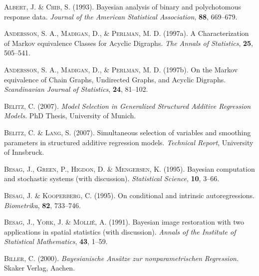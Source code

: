
\begin{thebibliography}{99}

\label{stepwiseregreferences}

 {\scshape Albert, J. \& Chib, S.} (1993).
 Bayesian analysis of binary and polychotomous response data.
 {\it Journal of the American Statistical Association}, {\bf 88}, 669--679.

 {\scshape Andersson, S. A., Madigan, D., \& Perlman, M. D.} (1997a).
 A Characterization of Markov equivalence Classes for Acyclic Digraphs.
 {\it The Annals of Statistics}, {\bf 25}, 505--541.

 {\scshape Andersson, S. A., Madigan, D., \& Perlman, M. D.} (1997b).
 On the Markov equivalence of Chain Graphs, Undirected Graphs, and Acyclic Digraphs.
 { \it Scandinavian Journal of Statistics}, {\bf  24}, 81--102.

 {\scshape Belitz, C.} (2007).
 {\it Model Selection in Generalized Structured Additive Regression Models.}
 PhD Thesis, University of Munich.

 {\scshape Belitz, C. \& Lang, S.} (2007).
 Simultaneous selection of variables and smoothing parameters in structured additive regression models.
 {\it Technical Report}, University of Innsbruck.

 {\scshape Besag, J., Green, P., Higdon, D. \& Mengersen, K.} (1995).
 Bayesian computation and stochastic systems (with discussion).
 {\it Statistical Science}, {\bf 10}, 3--66.

 {\scshape Besag, J. \& Kooperberg, C.} (1995).
 On conditional and intrinsic autoregressions.
 {\it Biometrika}, {\bf 82}, 733--746.

 {\scshape Besag, J., York, J. \& Molli\'{e}, A.} (1991).
 Bayesian image restoration with two applications in spatial statistics (with discussion).
 {\it Annals of the Institute of Statistical Mathematics}, {\bf 43}, 1--59.

 {\scshape Biller, C.} (2000).
 {\it Bayesianische Ans\"{a}tze zur nonparametrischen Regression.}
 Skaker Verlag, Aachen.


\end{thebibliography}
